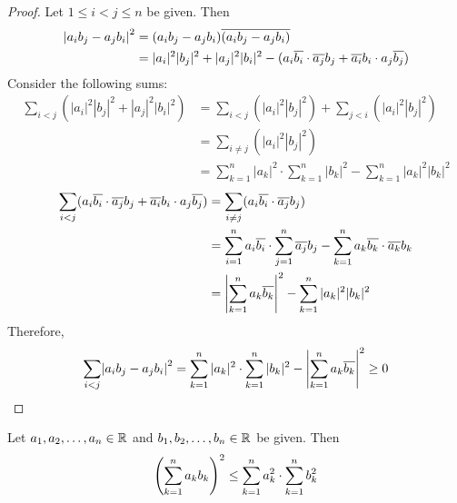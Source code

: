 \begin{proof}
    Let $1 \leq i < j \leq n$ be given. Then
    \begin{align*}
        \abs*{{a_{i} b_{j} - a_{j} b_{i}}}^{2} &= (a_{i} b_{j} - a_{j} b_{i}) \overline{(a_{i} b_{j} - a_{j} b_{i})} \\
        &= |a_{i}|^{2} |b_{j}|^{2} + |a_{j}|^{2} |b_{i}|^{2} - (a_{i} \overline{b_{i}} \cdot
        \overline{a_{j}} b_{j} + \overline{a_{i}} b_{i} \cdot a_{j} \overline{b_{j}})
    \end{align*}
    Consider the following sums:
    \begin{align*}
        \sum_{i < j} (|a_{i}|^{2} |b_{j}|^{2} + |a_{j}|^{2} |b_{i}|^{2})
        &= \sum_{i < j} (|a_{i}|^{2} |b_{j}|^{2}) + \sum_{j < i} (|a_{i}|^{2} |b_{j}|^{2}) \\
        &= \sum_{i \neq j} (|a_{i}|^{2} |b_{j}|^{2}) \\
        &= \sum_{k = 1}^{n} |a_{k}|^{2}
        \cdot \sum_{k = 1}^{n} |b_{k}|^{2} - \sum_{k = 1}^{n} |a_{k}|^{2} |b_{k}|^{2}
    \end{align*}
    \begin{align*}
        \sum_{i < j} (a_{i} \overline{b_{i}} \cdot \overline{a_{j}} b_{j}
        + \overline{a_{i}} b_{i} \cdot a_{j} \overline{b_{j}})
        &= \sum_{i \neq j} (a_{i} \overline{b_{i}} \cdot \overline{a_{j}} b_{j}) \\
        &= \sum_{i = 1}^{n} a_{i} \overline{b_{i}} \cdot \sum_{j = 1}^{n} \overline{a_{j}} b_{j}
        - \sum_{k = 1}^{n} a_{k} \overline{b_{k}} \cdot \overline{a_{k}} b_{k} \\
        &= \abs*{\sum_{k = 1}^{n} a_{k} \overline{b_{k}}}^{2} - \sum_{k = 1}^{n} |a_{k}|^{2} |b_{k}|^{2}
    \end{align*}
    Therefore,
    \[
    \sum_{i < j} \abs*{{a_{i} b_{j} - a_{j} b_{i}}}^{2} = \sum_{k = 1}^{n} |a_{k}|^{2} \cdot
    \sum_{k = 1}^{n} |b_{k}|^{2} - \abs*{\sum_{k = 1}^{n} a_{k} \overline{b_{k}}}^{2} \geq 0
    \]
\end{proof}

\begin{corollary} \label{an:cor:cauchy-schwarz-inequality-for-real-numbers}
    Let $a_{1}, a_{2}, \ldots, a_{n} \in \R$ and $b_{1}, b_{2}, \ldots, b_{n} \in \R$ be given. Then
    \[
    \paren*{\sum_{k = 1}^{n} a_{k} b_{k}}^{2} \leq \sum_{k = 1}^{n} a_{k}^{2} \cdot \sum_{k = 1}^{n} b_{k}^{2}
    \]
\end{corollary}

\bigskip

